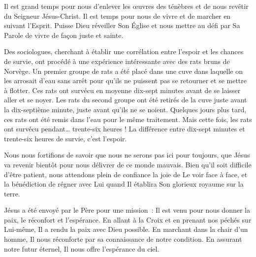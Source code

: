 Il est grand temps pour nous d'enlever les \oe{}uvres des ténèbres
 et de nous revêtir du Seigneur Jésus-Christ.
 Il est temps pour nous de vivre et de marcher en suivant l'Esprit.
 Puisse Dieu réveiller Son Église 
 et nous mettre au défi par Sa Parole de vivre de façon juste et sainte.

\dvrule






Des sociologues, cherchant à établir une corrélation
 entre l'espoir et les chances de survie,
 ont procédé à une expérience intéressante
 avec des rats bruns de Norvège.
 Un premier groupe de rats a été placé dans une cuve
 dans laquelle on les arrosait d'eau sans arrêt
 pour qu'ils ne puissent pas se retourner et se mettre à flotter.
 Ces rats ont survécu en moyenne dix-sept minutes
 avant de se laisser aller et se noyer.
 Les rats du second groupe ont été retirés de la cuve
 juste avant la dix-septième minute, juste avant qu'ils ne se noient.
 Quelques jours plus tard, ces rats ont été remis dans l'eau
 pour le même traitement.
 Mais cette fois, les rats ont survécu pendant\dots{} trente-six heures !
 La différence entre dix-sept minutes et trente-six heures de survie,
 c'est l'espoir.


Nous nous fortifions de savoir que nous ne serons pas ici pour toujours,
 que Jésus va revenir bientôt pour nous délivrer de ce monde mauvais.
 Bien qu'il soit difficile d'être patient, nous attendons plein de confiance
 la joie de Le voir face à face, et la bénédiction de régner avec Lui
 quand Il établira Son glorieux royaume sur la terre.

Jésus a été envoyé par le Père pour une mission~:
 Il est venu pour nous donner la paix, le réconfort et l'espérance.
 En allant à la Croix et en prenant nos péchés sur Lui-même,
 Il a rendu la paix avec Dieu possible.
 En marchant dans la chair d'un homme,
 Il nous réconforte par sa connaissance de notre condition.
 En assurant notre futur éternel, Il nous offre l'espérance du ciel.

